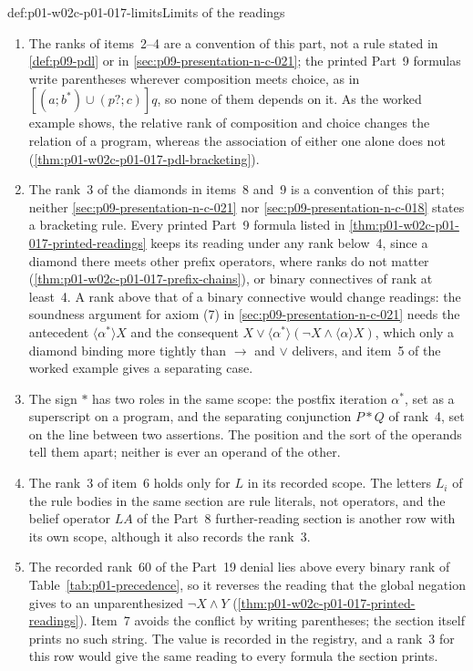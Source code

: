 \begin{hbwarning}{def:p01-w02c-p01-017-limits}{Limits of the readings}
\begin{enumerate}
\item The ranks of items~2--4 are a convention of this part, not a rule
  stated in \cref{def:p09-pdl} or in \cref{sec:p09-presentation-n-c-021};
  the printed Part~9 formulas write parentheses wherever composition meets
  choice, as in \([(a;b^{*})\cup(p?;c)]q\), so none of them depends on
  it.  As the worked example shows, the relative rank of composition and
  choice changes the relation of a program, whereas the association of
  either one alone does not (\cref{thm:p01-w02c-p01-017-pdl-bracketing}).
\item The rank~3 of the diamonds in items~8 and~9 is a convention of
  this part; neither \cref{sec:p09-presentation-n-c-021} nor
  \cref{sec:p09-presentation-n-c-018} states a bracketing rule.  Every
  printed Part~9 formula listed in
  \cref{thm:p01-w02c-p01-017-printed-readings} keeps its reading under
  any rank below~4, since a diamond there meets other prefix operators,
  where ranks do not matter (\cref{thm:p01-w02c-p01-017-prefix-chains}),
  or binary connectives of rank at least~4.  A rank above that of a
  binary connective would change readings: the soundness argument for
  axiom (7) in \cref{sec:p09-presentation-n-c-021} needs the antecedent
  \(\langle\alpha^{*}\rangle X\) and the consequent
  \(X\lor\langle\alpha^{*}\rangle(\neg X\land\langle\alpha\rangle X)\),
  which only a diamond binding more tightly than \(\to\) and \(\lor\)
  delivers, and item~5 of the worked example gives a separating case.
\item The sign \(*\) has two roles in the same scope: the postfix
  iteration \(\alpha^{*}\), set as a superscript on a program, and the
  separating conjunction \(P*Q\) of rank~4, set on the line between two
  assertions.  The position and the sort of the operands tell them apart;
  neither is ever an operand of the other.
\item The rank~3 of item~6 holds only for \(L\) in its recorded scope.
  The letters \(L_i\) of the rule bodies in the same section are rule
  literals, not operators, and the belief operator \(LA\) of the Part~8
  further-reading section is another row with its own scope, although it
  also records the rank~3.
\item The recorded rank~60 of the Part~19 denial lies above every binary
  rank of Table~\ref{tab:p01-precedence}, so it reverses the reading that
  the global negation gives to an unparenthesized \(\neg X\land Y\)
  (\cref{thm:p01-w02c-p01-017-printed-readings}).  Item~7 avoids the
  conflict by writing parentheses; the section itself prints no such
  string.  The value is recorded in the registry, and a rank~3 for this
  row would give the same reading to every formula the section prints.
\end{enumerate}
\end{hbwarning}

